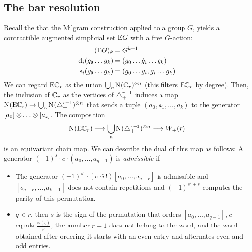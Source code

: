 \subsection{The bar resolution}\label{ss:milgram} Recall the that the Milgram construction applied to a group $G$, yields a contractible augmented simplicial set $\mathrm{E}G$ with a free $G$-action:
\begin{align*}
	(\mathrm{E}G)_k &= G^{k+1}\\
	\operatorname{d}_i(g_0\dots g_k) &= (g_0\dots\hat{g}_i\dots g_k) \\
	\operatorname{s}_i(g_0\dots g_k) &= (g_0\dots g_i,g_i\dots g_k)
\end{align*}
We can regard $\mathrm{E}\mathbb{C}_r$ as the union $\bigcup_n \operatorname{N}_{}(\mathbb{C}_r)^{\otimes n}$ (this filters $\mathrm{E}\mathbb{C}_r$ by degree). Then, the inclusion of $\mathbb{C}_r$ as the vertices of $\triangle_{+}^{r-1}$ induces a map $\operatorname{N}_{}(\mathrm{E}\mathbb{C}_r) \to \bigcup_n\operatorname{N}_{}(\triangle_{+}^{r-1})^{\otimes n}$ that sends a tuple $(a_0,a_1,\dots,a_k)$ to the generator $[a_0]\otimes \ldots \otimes [a_k]$. The composition
\[
\operatorname{N}_{}(\mathrm{E}\mathbb{C}_r) \longrightarrow \bigcup_n\operatorname{N}_{}(\triangle_{+}^{r-1})^{\otimes n} \longrightarrow W_+(r)
\]
is an equivariant chain map. We can describe the dual of this map as follows: A generator $(-1)^{s}\cdot c\cdot (a_0,\ldots,a_{q-1})$ is \emph{admissible} if 
\begin{itemize}
	\item The generator $(-1)^{s'}\cdot (c\cdot \tilde{r}!) [a_0,\ldots,a_{q-r}]$ is admissible and $[a_{q-r},\ldots,a_{k-1}]$ does not contain repetitions and $(-1)^{s'+s}$ computes the parity of this permutation.
	\item $q<r$, then $s$ is the sign of the permutation that orders $[a_0,\ldots,a_{q-1}]$, $c$ equals $\frac{\varphi(q)}{\tilde{r}!}$, the number $r-1$ does not belong to the word, and the word obtained after ordering it starts with an even entry and alternates even and odd entries.
\end{itemize}

